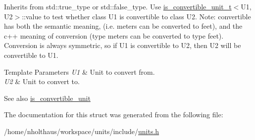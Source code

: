 Inherits from {\ttfamily std\+::true\+\_\+type} or {\ttfamily std\+::false\+\_\+type}. Use {\ttfamily \hyperlink{structunits_1_1traits_1_1is__convertible__unit__t}{is\+\_\+convertible\+\_\+unit\+\_\+t}$<$U1, U2$>$\+::value} to test whether {\ttfamily class U1} is convertible to {\ttfamily class U2}. Note\+: convertible has both the semantic meaning, (i.\+e. meters can be converted to feet), and the c++ meaning of conversion (type meters can be converted to type feet). Conversion is always symmetric, so if U1 is convertible to U2, then U2 will be convertible to U1. 
\begin{DoxyTemplParams}{Template Parameters}
{\em U1} & Unit to convert from. \\
\hline
{\em U2} & Unit to convert to. \\
\hline
\end{DoxyTemplParams}
\begin{DoxySeeAlso}{See also}
\hyperlink{structunits_1_1traits_1_1is__convertible__unit}{is\+\_\+convertible\+\_\+unit} 
\end{DoxySeeAlso}


The documentation for this struct was generated from the following file\+:\begin{DoxyCompactItemize}
\item 
/home/nholthaus/workspace/units/include/\hyperlink{units_8h}{units.\+h}\end{DoxyCompactItemize}
